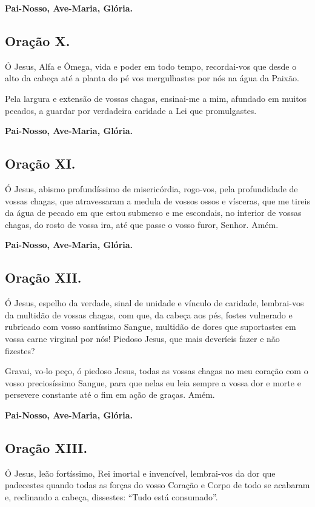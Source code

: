 \documentclass[11pt]{article}
\begin{document}
\textbf{Pai-Nosso, Ave-Maria, Glória.}

\subsection{Oração X.}
Ó Jesus, Alfa e Ômega, vida e poder em todo tempo, recordai-vos que desde o alto da cabeça até a planta do pé vos mergulhastes por nós na água da Paixão.

Pela largura e extensão de vossas chagas, ensinai-me a mim, afundado em muitos pecados, a guardar por verdadeira caridade a Lei que promulgastes. 

\textbf{Pai-Nosso, Ave-Maria, Glória.}

\subsection{Oração XI.}
Ó Jesus, abismo profundíssimo de misericórdia, rogo-vos, pela profundidade de vossas chagas, que atravessaram a medula de vossos ossos e vísceras, que me tireis da água de pecado em que estou submerso e me escondais, no interior de vossas chagas, do rosto de vossa ira, até que passe o vosso furor, Senhor. Amém. 

\textbf{Pai-Nosso, Ave-Maria, Glória.}

\subsection{Oração XII.}
Ó Jesus, espelho da verdade, sinal de unidade e vínculo de caridade, lembrai-vos da multidão de vossas chagas, com que, da cabeça aos pés, fostes vulnerado e rubricado com vosso santíssimo Sangue, multidão de dores que suportastes em vossa carne virginal por nós! Piedoso Jesus, que mais deveríeis fazer e não fizestes?

Gravai, vo-lo peço, ó piedoso Jesus, todas as vossas chagas no meu coração com o vosso preciosíssimo Sangue, para que nelas eu leia sempre a vossa dor e morte e persevere constante até o fim em ação de graças. Amém. 

\textbf{Pai-Nosso, Ave-Maria, Glória.}

\subsection{Oração XIII.}
Ó Jesus, leão fortíssimo, Rei imortal e invencível, lembrai-vos da dor que padecestes quando todas as forças do vosso Coração e Corpo de todo se acabaram e, reclinando a cabeça, dissestes: “Tudo está consumado”. 
\end{document}
